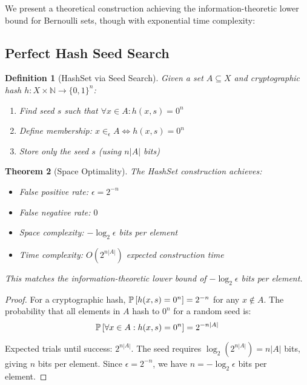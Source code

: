 \documentclass[11pt,final,hidelinks]{article}
\newtheorem{theorem}{Theorem}[section]
\newtheorem{definition}[theorem]{Definition}
\begin{document}
We present a theoretical construction achieving the information-theoretic lower bound for Bernoulli sets, though with exponential time complexity:

\subsection{Perfect Hash Seed Search}

\begin{definition}[HashSet via Seed Search]
Given a set $A \subseteq X$ and cryptographic hash $h : X \times \mathbb{N} \to \{0,1\}^n$:
\begin{enumerate}
    \item Find seed $s$ such that $\forall x \in A: h(x, s) = 0^n$
    \item Define membership: $x \in_\epsilon A \iff h(x, s) = 0^n$
    \item Store only the seed $s$ (using $n|A|$ bits)
\end{enumerate}
\end{definition}

\begin{theorem}[Space Optimality]
The HashSet construction achieves:
\begin{itemize}
    \item False positive rate: $\epsilon = 2^{-n}$
    \item False negative rate: $0$
    \item Space complexity: $-\log_2 \epsilon$ bits per element
    \item Time complexity: $O(2^{n|A|})$ expected construction time
\end{itemize}
This matches the information-theoretic lower bound of $-\log_2 \epsilon$ bits per element.
\end{theorem}

\begin{proof}
For a cryptographic hash, $\mathbb{P}\left[h(x,s) = 0^n\right] = 2^{-n}$ for any $x \notin A$. The probability that all elements in $A$ hash to $0^n$ for a random seed is:
\begin{equation}
\mathbb{P}\left[\forall x \in A: h(x,s) = 0^n\right] = 2^{-n|A|}
\end{equation}

Expected trials until success: $2^{n|A|}$. The seed requires $\log_2(2^{n|A|}) = n|A|$ bits, giving $n$ bits per element. Since $\epsilon = 2^{-n}$, we have $n = -\log_2 \epsilon$ bits per element.
\end{proof}
\end{document}
